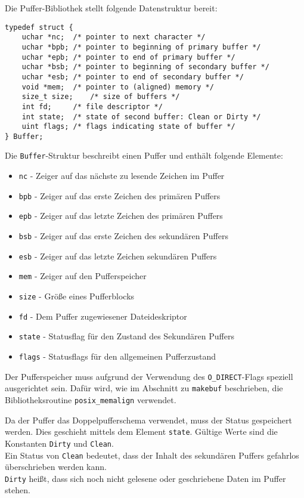 Die Puffer-Bibliothek stellt folgende Datenstruktur bereit:
\begin{lstlisting}
typedef struct {
	uchar *nc;	/* pointer to next character */
	uchar *bpb;	/* pointer to beginning of primary buffer */
	uchar *epb;	/* pointer to end of primary buffer */
	uchar *bsb;	/* pointer to beginning of secondary buffer */
	uchar *esb;	/* pointer to end of secondary buffer */
	void *mem;	/* pointer to (aligned) memory */
	size_t size;	/* size of buffers */
	int fd;		/* file descriptor */
	int state;	/* state of second buffer: Clean or Dirty */
	uint flags;	/* flags indicating state of buffer */
} Buffer;
\end{lstlisting}

Die \texttt{Buffer}-Struktur beschreibt einen Puffer und enthält folgende Elemente:

\begin{itemize}
\item \texttt{nc} - Zeiger auf das nächste zu lesende Zeichen im Puffer
\item \texttt{bpb} - Zeiger auf das erste Zeichen des primären Puffers
\item \texttt{epb} - Zeiger auf das letzte Zeichen des primären Puffers
\item \texttt{bsb} - Zeiger auf das erste Zeichen des sekundären Puffers
\item \texttt{esb} - Zeiger auf das letzte Zeichen sekundären Puffers
\item \texttt{mem} - Zeiger auf den Pufferspeicher
\item \texttt{size} - Größe eines Pufferblocks
\item \texttt{fd} - Dem Puffer zugewiesener Dateideskriptor
\item \texttt{state} - Statusflag für den Zustand des Sekundären Puffers
\item \texttt{flags} - Statusflags für den allgemeinen Pufferzustand
\end{itemize}

Der Pufferspeicher muss aufgrund der Verwendung des \texttt{O\_DIRECT}-Flags speziell ausgerichtet sein.
Dafür wird, wie im Abschnitt zu \texttt{makebuf} beschrieben,
die Bibliotheksroutine \texttt{posix\_memalign} verwendet.

Da der Puffer das Doppelpufferschema verwendet,
muss der Status gespeichert werden.
Dies geschieht mittels dem Element \texttt{state}.
Gültige Werte sind die Konstanten \texttt{Dirty} und \texttt{Clean}. \\
Ein Status von \texttt{Clean} bedeutet,
dass der Inhalt des sekundären Puffers gefahrlos überschrieben werden kann. \\
\texttt{Dirty} heißt, dass sich noch nicht gelesene oder geschriebene Daten im Puffer stehen.

